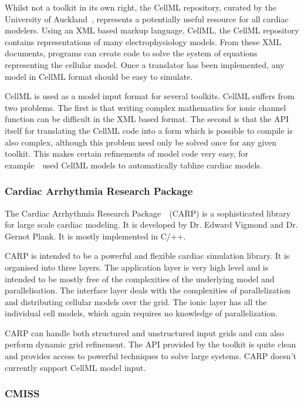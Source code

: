 Whilst not a toolkit in its own right, the CellML repository, curated by the
University of Auckland~\cite{Lloyd2008}, represents a potentially useful
resource for all cardiac modelers.
Using an XML based markup language, CellML, the CellML repository contains
representations of many electrophysiology models.
From these XML documents, programs can create code to solve the system of
equations representing the cellular model.
Once a translator has been implemented, any model in CellML format should be
easy to simulate.

CellML is used as a model input format for several toolkits.
CellML suffers from two problems.
The first is that writing complex mathematics for ionic channel function can be
difficult in the XML based format.
The second is that the API itself for translating the CellML code into a form
which is possible to compile is also complex, although this problem need only be
solved once for any given toolkit.
This makes certain refinements of model code very easy, for
example~\cite{Cooper2006}\ used CellML models to automatically tablize cardiac
models.


\subsubsection{Cardiac Arrhythmia Research Package}

The Cardiac Arrhythmia Research Package~\cite{Vigmond2003,Bauer2007,Plank2007,Vigmond2007}\
(CARP) is a sophisticated library for large scale cardiac modeling.
It is developed by Dr. Edward Vigmond and Dr. Gernot Plank.
It is mostly implemented in C/++.

CARP is intended to be a powerful and flexible cardiac simulation library.
It is organised into three layers.
The application layer is very high level and is intended to be mostly free of
the complexities of the underlying model and parallelisation.
The interface layer deals with the complexities of parallelization and
distributing cellular models over the grid.
The ionic layer has all the individual cell models, which again requires no
knowledge of parallelization.

CARP can handle both structured and unstructured input grids and can also
perform dynamic grid refinement.
The API provided by the toolkit is quite clean and provides access to powerful
techniques to solve large systems.
CARP doesn't currently support CellML model input.


\subsubsection{CMISS}

